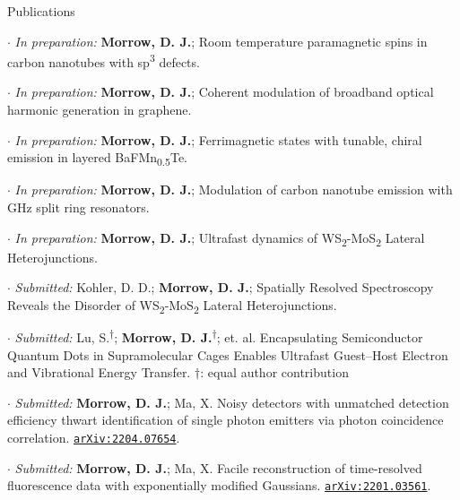 \documentclass{resume} %
\begin{document}
\begin{rSection}{Publications}
	
\begin{etaremune}[topsep=0pt,itemsep=0pt,partopsep=0pt,parsep=0pt]


\item[$\cdot$] \textit{In preparation:} \textbf{Morrow, D. J.}; Room temperature paramagnetic spins in carbon nanotubes with sp\textsuperscript{3} defects.

\item[$\cdot$] \textit{In preparation:} \textbf{Morrow, D. J.};  Coherent modulation of broadband optical harmonic generation in graphene.

\item[$\cdot$] \textit{In preparation:} \textbf{Morrow, D. J.}; Ferrimagnetic states with tunable, chiral emission in layered BaFMn\textsubscript{0.5}Te.

\item[$\cdot$] \textit{In preparation:} \textbf{Morrow, D. J.}; Modulation of carbon nanotube emission with GHz split ring resonators. 

\item[$\cdot$] \textit{In preparation:} \textbf{Morrow, D. J.}; Ultrafast dynamics of WS\textsubscript{2}-MoS\textsubscript{2} Lateral Heterojunctions.

\item[$\cdot$] \textit{Submitted:} Kohler, D. D.; \textbf{Morrow, D. J.};  Spatially Resolved Spectroscopy Reveals the Disorder of WS\textsubscript{2}-MoS\textsubscript{2} Lateral Heterojunctions.

\item[$\cdot$] \textit{Submitted:} Lu, S.\textsuperscript{$\dagger$}; \textbf{Morrow, D. J.}\textsuperscript{$\dagger$}; et. al.  Encapsulating Semiconductor Quantum Dots in Supramolecular Cages Enables Ultrafast Guest–Host Electron and Vibrational Energy Transfer. $\dagger$: equal author contribution 

\item[$\cdot$] \textit{Submitted:} \textbf{Morrow, D. J.}; Ma, X. Noisy detectors with unmatched detection efficiency thwart identification of single photon emitters via photon coincidence correlation. \href{http://arxiv.org/abs/2204.07654}{\texttt{arXiv:2204.07654}}.

\item[$\cdot$] \textit{Submitted:} \textbf{Morrow, D. J.}; Ma, X. Facile reconstruction of time-resolved fluorescence data with exponentially modified Gaussians. \href{http://arxiv.org/abs/2201.03561}{\texttt{arXiv:2201.03561}}.


\end{etaremune}
\end{rSection}
\end{document}
